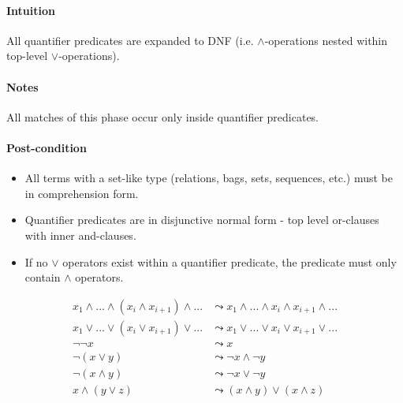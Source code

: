 \documentclass{article}
\begin{document}
\paragraph{Intuition} All quantifier predicates are expanded to DNF (i.e. $\land$-operations nested within top-level $\lor$-operations).

\paragraph{Notes} All matches of this phase occur only inside quantifier predicates.

\paragraph{Post-condition}
\begin{itemize}
  \item All terms with a set-like type (relations, bags, sets, sequences, etc.) must be in comprehension form.
  \item Quantifier predicates are in disjunctive normal form - top level or-clauses with inner and-clauses.
  \item If no $\lor$ operators exist within a quantifier predicate, the predicate must only contain $\land$ operators.
\end{itemize}

\noindent\begin{minipage}{\linewidth} %
\begin{align}
  \tag{Flatten Nested $\land$}
  x_1 \land ... \land (x_i \land x_{i+1}) \land ...
  &\leadsto
  x_1 \land ... \land x_i \land x_{i+1} \land ...
  \\
  \tag{Flatten Nested $\lor$}
  x_1 \lor ... \lor (x_i \lor x_{i+1}) \lor ...
  &\leadsto
  x_1 \lor ... \lor x_i \lor x_{i+1} \lor ...
  \\
  \tag{Double Negation}
  \lnot \lnot x
  &\leadsto
  x
  \\
  \tag{Distribute De Morgan - Or}
  \lnot (x \lor y)
  &\leadsto
  \lnot x \land \lnot y
  \\
  \tag{Distribute De Morgan - And}
  \lnot (x \land y)
  &\leadsto
  \lnot x \lor \lnot y
  \\
  \tag{Distribute $\land$ over $\lor$}
  x \land (y \lor z)
  &\leadsto
  (x \land y) \lor (x \land z)
\end{align}
\end{minipage}
\end{document}

